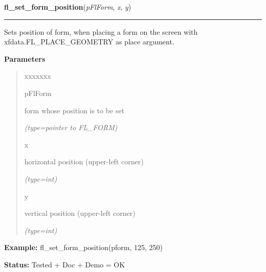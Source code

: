     \vspace{0.5ex}

\hspace{.8\funcindent}\begin{boxedminipage}{\funcwidth}

    \raggedright \textbf{fl\_set\_form\_position}(\textit{pFlForm}, \textit{x}, \textit{y})

    \vspace{-1.5ex}

    \rule{\textwidth}{0.5\fboxrule}
\setlength{\parskip}{2ex}
    Sets position of form, when placing a form on the screen with 
    xfdata.FL\_PLACE\_GEOMETRY as place argument.

\setlength{\parskip}{1ex}
      \textbf{Parameters}
      \vspace{-1ex}

      \begin{quote}
        \begin{Ventry}{xxxxxxx}

          \item[pFlForm]

          form whose position is to be set

            {\it (type=pointer to FL\_FORM)}

          \item[x]

          horizontal position (upper-left corner)

            {\it (type=int)}

          \item[y]

          vertical position (upper-left corner)

            {\it (type=int)}

        \end{Ventry}

      \end{quote}

\textbf{Example:} fl\_set\_form\_position(pform, 125, 250)



\textbf{Status:} Tested + Doc + Demo = OK



    \end{boxedminipage}

    \label{xformslib:flbasic:fl_set_form_title}

